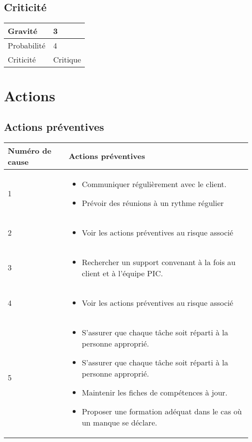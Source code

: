 \subsection*{Criticité}

\begin{table}[H]
\centering
	\begin{tabularx}{16.8cm}{|>{\columncolor{gray!40}}X|X|}
	\hline
	Gravité & 3\\
	\hline
	Probabilité & 4\\
	\hline
	Criticité & Critique \\
	\hline
	\end{tabularx}
\end{table}
\newpage

\section*{Actions}
\subsection*{Actions préventives}

\centering
	\begin{longtable}{|p{7cm}|p{7cm}|}
	\hline
	\rowcolor{gray!40} Numéro de cause & Actions préventives \\
	\hline
	 1 & \begin{itemize}
	 	\item Communiquer régulièrement avec le client.
	 	\item
	 	Prévoir des réunions à un rythme régulier
	 \end{itemize} \\
	\hline
	2 & \begin{itemize}
		\item Voir les actions préventives au risque associé 
	\end{itemize} \\
	\hline
	3 & \begin{itemize}
		\item Rechercher un support convenant à la fois au client et à l'équipe PIC.
	\end{itemize} \\
	\hline
	4 & \begin{itemize}
		\item Voir les actions préventives au risque associé 
	\end{itemize} \\
	\hline
	5 & \begin{itemize}
		\item S'assurer que chaque tâche soit réparti
à la personne approprié.
	\item
	S'assurer que chaque tâche soit réparti
à la personne approprié.
\item Maintenir les fiches de compétences à jour. 
\item Proposer une formation adéquat dans le cas où un manque se déclare.	
	
	\end{itemize} \\
	\hline
	\end{longtable}

